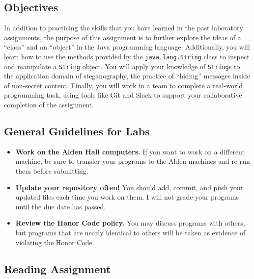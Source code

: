 



\subsection*{Objectives}
\vspace{-0.05in}

In addition to practicing the skills that you have learned in the past laboratory assignments, the purpose of this
assignment is to further explore the ideas of a ``class'' and an ``object'' in the Java programming language.
Additionally, you will learn how to use the methods provided by the {\tt java.lang.String} class to inspect and
manipulate a {\tt String} object. You will apply your knowledge of {\tt String}s to the application domain of
steganography, the practice of ``hiding'' messages inside of non-secret content. Finally, you will work in a team to
complete a real-world programming task, using tools like Git and Slack to support your collaborative completion of the
assignment.

\subsection*{General Guidelines for Labs}
\vspace{-0.05in}
\begin{itemize}
\item
{\bf Work on the Alden Hall computers.} If you want to work on a different
machine, be sure to transfer your programs to the Alden
machines and re-run them before submitting.
\item
{\bf Update your repository often!} You should add, commit,
and push your updated files each time you work on them.  I will not grade
your programs until the due date has passed.
\item
{\bf Review the Honor Code policy.} You
may discuss programs with others, but programs that are nearly identical
to others will be taken as evidence of violating the Honor Code.
\end{itemize}

\subsection*{Reading Assignment}
\vspace{-0.05in}

